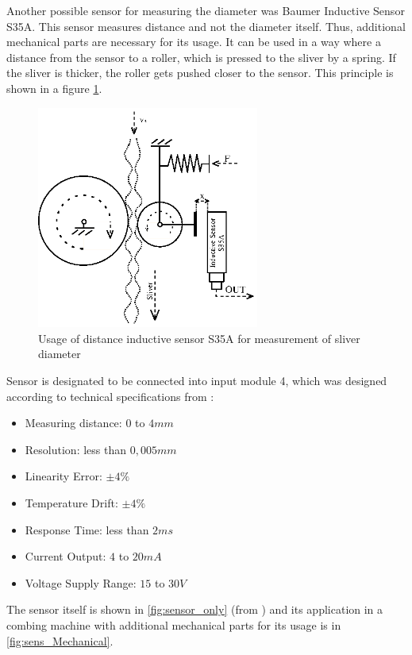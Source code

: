 \documentclass[twoside]{ctuthesis}
\theoremstyle{plain}
\theoremstyle{definition}
\theoremstyle{note}
\begin{document}
Another possible sensor for measuring the diameter was Baumer Inductive Sensor S35A. This sensor measures distance and not the diameter itself. Thus, additional mechanical parts are necessary for its usage. It can be used in a way where a distance from the sensor to a roller, which is pressed to the sliver by a spring. If the sliver is thicker, the roller gets pushed closer to the sensor. This principle is shown in a figure \ref{fig:inductiveSensorDiagram}.
\begin{figure}[h]
	\centering
	\includegraphics[width=0.65\textwidth]{SensorDiagram.eps}
	\caption{Usage of distance inductive sensor S35A for measurement of sliver diameter}
	\label{fig:inductiveSensorDiagram}
\end{figure}
Sensor is designated to be connected into input module 4, which was designed according to technical specifications from \cite{cite:InductiveSensor}:
\begin{itemize}
	\setlength{\itemsep}{5pt}
	\item Measuring distance: $0$ to $4mm$
	\item Resolution: less than $0,005 mm$
	\item Linearity Error: $\pm4\%$
	\item Temperature Drift: $\pm4\%$
	\item Response Time: less than $2ms$
	\item Current Output: $4$ to $20mA$
	\item Voltage Supply Range: $15$ to $30V$    
\end{itemize}
The sensor itself is shown in \ref{fig:sensor_only} (from \cite{cite:InductiveSensor}) and its application in a combing machine with additional mechanical parts for its usage is in \ref{fig:sens_Mechanical}.
\end{document}
